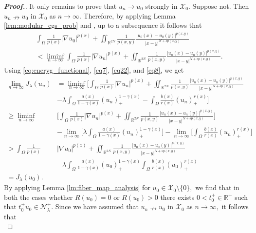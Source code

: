 \documentclass[11pt]{article}
\newcommand{\X}{\mathcal{X}_{0}}
\newcommand{\Nh}{\mathcal{N}_\la}
\newcommand{\ga} {\gamma}
\newcommand{\om} {\Omega}
\newcommand{\la} {\lambda}
\newcommand{\ra} {\rightarrow}
\newcommand{\real}{\mathbb{R}}
\newcommand{\grad}{\nabla}
\begin{document}
\begin{proof}[\bf Proof.]
    It only remains to prove that $u_n\ra u_0$
strongly in $\X.$
Suppose not.
Then $u_n\nrightarrow u_0$
in $\X$
as $n\to\infty.$
Therefore, by applying Lemma 
\ref{lem:modular_cgs_prob} and
\cite[Lemma 2.4.17]{Variable_book}, 
up to a subsequence it follows that
        \begin{align}\label{eq8}
        &
\int_\om 
\frac{1}{p(x)}|\grad u_0|^{p(x)} +\iint_{\mathbb{R}^{2N}} 
\frac{1}{p(x,y)}
\frac{|u_0(x)-u_0(y)|^{p(x,y)}}{|x-y|^{N+sp(x,y)}} \nonumber\\
        &<\liminf_{n\to\infty}
\int_\om 
\frac{1}{p(x)}|\grad u_n|^{p(x)}+\iint_{\mathbb{R}^{2N}} 
\frac{1}{p(x,y)}
\frac{|u_n(x)-u_n(y)|^{p(x,y)}}{|x-y|^{N+sp(x,y)}}.
    \end{align}
    Using \eqref{eq:eneryg_functional}, 
    \eqref{eq7}, \eqref{eq22}, and \eqref{eq8}, we get
\begin{align}\label{eq9}
\lim_{n\to \infty} J_\la(u_n)
& =
\liminf_{n\to \infty}
\Big [
\int_\om 
\frac{1}{p(x)} |\grad u_n|^{p(x)}
\! + \! 
\iint_{\mathbb{R}^{2N}} 
\frac{1}{p(x,y)}
\frac{|u_n(x)-u_n(y)|^{p(x,y)}}
{|x-y|^{N+sp(x,y)}} \nonumber\\
        &  -\la
\int_\om 
\frac{a(x)}{1-\ga(x)}(u_n)_+^{1-\ga(x)}
        -
\int_\om 
\frac{b(x)}{r(x)}(u_n)_+^{r(x)}\Big ]\nonumber\\
        \geq \liminf_{n\to \infty}
        & \Big [
\int_\om 
\frac{1}{p(x)}|\grad u_n|^{p(x)}
+\iint_{\mathbb{R}^{2N}} 
\frac{1}{p(x,y)}
\frac{|u_n(x)-u_n(y)|^{p(x,y)}}
{|x-y|^{N+sp(x,y)}}\Big ]\nonumber\\
               & -\lim_{n\to\infty}\Big [\la
\int_\om 
\frac{a(x)}{1-\ga(x)}(u_n)_+^{1-\ga(x)}\Big ]
-\lim_{n\to\infty}\Big [
\int_\om 
\frac{b(x)}{r(x)}(u_n)_+^{r(x)}\Big ]\nonumber\\
        >
\int_\om 
\frac{1}{p(x)}&|\grad u_0|^{p(x)}
+\iint_{\mathbb{R}^{2N}}
\frac{1}{p(x,y)}
\frac{|u_0(x)-u_0(y)|^{p(x,y)}}
{|x-y|^{N+sp(x,y)}}\nonumber\\
                &-\la
\int_\om 
\frac{a(x)}{1-\ga(x)}(u_0)_+^{1-\ga(x)}    
\int_\om 
\frac{b(x)}{r(x)}(u_0)_+^{r(x)}\nonumber\\
        =J_\la(u_0).
    \end{align}
By applying Lemma 
\ref{lm:fiber_map_analysis} for 
$u_0\in \X\setminus\{0\},$
we find that in both the cases whether 
$R(u_0)=0$
or $R(u_0)>0$
there exists $0<t_0^+\in \real^+$
such that $t_0^+u_0\in\Nh^+.$
Since we have assumed that 
$u_n\nrightarrow u_0$
in $\X$
as $n\to\infty,$
it follows that
\begin{equation}\label{eq10}

\end{equation}
\end{proof}
\end{document}
